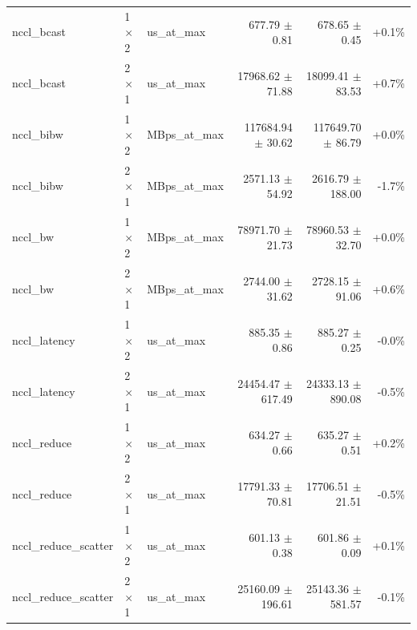 \begin{tabular}{lllrrr}
nccl\_bcast & 1$\times$2 & us\_at\_max & 677.79 $\pm$ 0.81 & 678.65 $\pm$ 0.45 & +0.1\% \\
nccl\_bcast & 2$\times$1 & us\_at\_max & 17968.62 $\pm$ 71.88 & 18099.41 $\pm$ 83.53 & +0.7\% \\
nccl\_bibw & 1$\times$2 & MBps\_at\_max & 117684.94 $\pm$ 30.62 & 117649.70 $\pm$ 86.79 & +0.0\% \\
nccl\_bibw & 2$\times$1 & MBps\_at\_max & 2571.13 $\pm$ 54.92 & 2616.79 $\pm$ 188.00 & -1.7\% \\
nccl\_bw & 1$\times$2 & MBps\_at\_max & 78971.70 $\pm$ 21.73 & 78960.53 $\pm$ 32.70 & +0.0\% \\
nccl\_bw & 2$\times$1 & MBps\_at\_max & 2744.00 $\pm$ 31.62 & 2728.15 $\pm$ 91.06 & +0.6\% \\
nccl\_latency & 1$\times$2 & us\_at\_max & 885.35 $\pm$ 0.86 & 885.27 $\pm$ 0.25 & -0.0\% \\
nccl\_latency & 2$\times$1 & us\_at\_max & 24454.47 $\pm$ 617.49 & 24333.13 $\pm$ 890.08 & -0.5\% \\
nccl\_reduce & 1$\times$2 & us\_at\_max & 634.27 $\pm$ 0.66 & 635.27 $\pm$ 0.51 & +0.2\% \\
nccl\_reduce & 2$\times$1 & us\_at\_max & 17791.33 $\pm$ 70.81 & 17706.51 $\pm$ 21.51 & -0.5\% \\
nccl\_reduce\_scatter & 1$\times$2 & us\_at\_max & 601.13 $\pm$ 0.38 & 601.86 $\pm$ 0.09 & +0.1\% \\
nccl\_reduce\_scatter & 2$\times$1 & us\_at\_max & 25160.09 $\pm$ 196.61 & 25143.36 $\pm$ 581.57 & -0.1\% \\
\bottomrule
\end{tabular}
